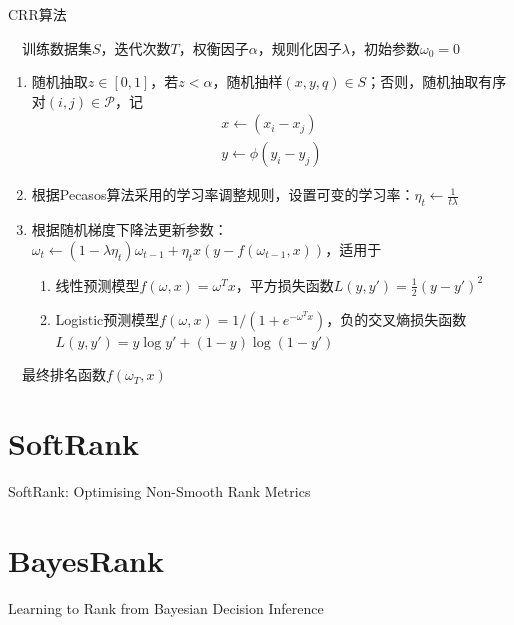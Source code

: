 \begin{algorithm}[htbp]
        \caption{CRR算法}
        \begin{algorithmic}
            \REQUIRE ~~训练数据集$S$，迭代次数$T$，权衡因子$\alpha$，规则化因子$\lambda$，初始参数$\omega_0=0$\\
            \STATE
            \begin{enumerate}
              \item 随机抽取$z\in [0,1]$，若$z<\alpha$，随机抽样$(x,y,q)\in S$；否则，随机抽取有序对$(i,j)\in \mathscr P$，记
                  \[
                    \begin{array}{l}
                      x \leftarrow (x_i-x_j) \\
                      y \leftarrow \phi(y_i-y_j)
                    \end{array}
                  \]
              \item 根据Pecasos算法\cite{shalev2007pegasos}采用的学习率调整规则，设置可变的学习率：$\eta_t \leftarrow \frac{1}{t\lambda}$
              \item 根据随机梯度下降法更新参数：$\omega_t \leftarrow (1-\lambda \eta_t) \omega_{t-1} + \eta_t x (y-f(\omega_{t-1},x))$，适用于
              \begin{enumerate}
                \item 线性预测模型$f(\omega,x) = \omega^T x$，平方损失函数$L(y,y') = \frac{1}{2} (y-y')^2$
                \item Logistic预测模型$f(\omega,x)= 1/(1+e^{-\omega^T x})$，负的交叉熵损失函数$L(y,y') = y \log{y'} + (1-y) \log{(1-y')}$
              \end{enumerate}
            \end{enumerate}
            \ENDFOR
            \ENSURE ~~最终排名函数$f(\omega_T,x)$
        \end{algorithmic}
\end{algorithm}

\section{SoftRank}
SoftRank: Optimising Non-Smooth Rank Metrics\cite{taylor2008softrank}

\section{BayesRank}
Learning to Rank from Bayesian Decision Inference\cite{kuo2009learning}

